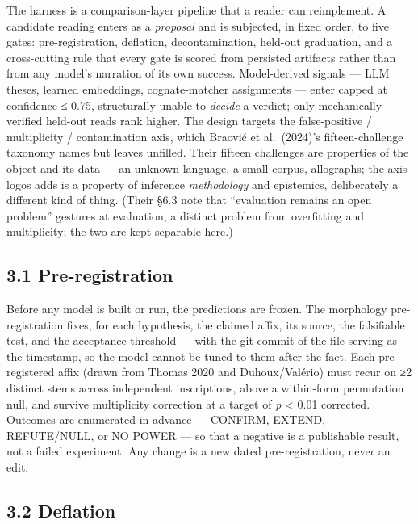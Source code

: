 \documentclass[
  10pt,
]{article}
\begin{document}
The harness is a comparison-layer pipeline that a reader can
reimplement. A candidate reading enters as a \emph{proposal} and is
subjected, in fixed order, to five gates: pre-registration, deflation,
decontamination, held-out graduation, and a cross-cutting rule that
every gate is scored from persisted artifacts rather than from any
model's narration of its own success. Model-derived signals --- LLM
theses, learned embeddings, cognate-matcher assignments --- enter capped
at confidence ≤ 0.75, structurally unable to \emph{decide} a verdict;
only mechanically-verified held-out reads rank higher. The design
targets the false-positive / multiplicity / contamination axis, which
Braović et al.~(2024)'s fifteen-challenge taxonomy names but leaves
unfilled. Their fifteen challenges are properties of the object and its
data --- an unknown language, a small corpus, allographs; the axis logos
adds is a property of inference \emph{methodology} and epistemics,
deliberately a different kind of thing. (Their §6.3 note that
``evaluation remains an open problem'' gestures at evaluation, a
distinct problem from overfitting and multiplicity; the two are kept
separable here.)

\hypertarget{pre-registration}{%
\subsection{3.1 Pre-registration}\label{pre-registration}}

Before any model is built or run, the predictions are frozen. The
morphology pre-registration fixes, for each hypothesis, the claimed
affix, its source, the falsifiable test, and the acceptance threshold
--- with the git commit of the file serving as the timestamp, so the
model cannot be tuned to them after the fact. Each pre-registered affix
(drawn from Thomas 2020 and Duhoux/Valério) must recur on ≥2 distinct
stems across independent inscriptions, above a within-form permutation
null, and survive multiplicity correction at a target of \emph{p}
\textless{} 0.01 corrected. Outcomes are enumerated in advance ---
CONFIRM, EXTEND, REFUTE/NULL, or NO POWER --- so that a negative is a
publishable result, not a failed experiment. Any change is a new dated
pre-registration, never an edit.

\hypertarget{deflation}{%
\subsection{3.2 Deflation}\label{deflation}}
\end{document}
